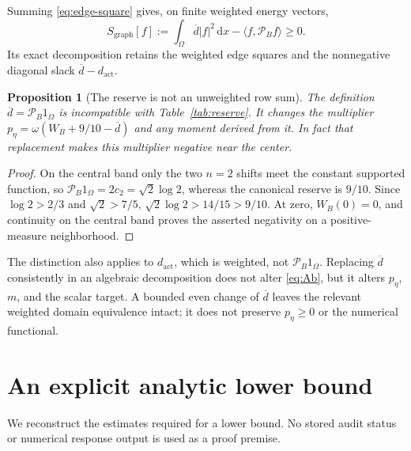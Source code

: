 \documentclass[11pt,a4paper]{article}
\newcommand{\ip}[2]{\langle #1,#2\rangle}
\newcommand{\dd}{\,\mathrm dx}
\newcommand{\peta}{p_{\eta}}
\newcommand{\dbar}{\overline d}
\newcommand{\Pp}{\mathcal P_B}
\newtheorem{proposition}[theorem]{Proposition}
\theoremstyle{remark}
\numberwithin{equation}{section}
\begin{document}
Summing \eqref{eq:edge-square} gives, on finite weighted energy vectors,
\begin{equation}\label{eq:Sgraph}
 S_{\mathrm{graph}}[f]
 :=\int_\Omega\dbar|f|^2\dd-\ip{f}{\Pp f}\ge0.
\end{equation}
Its exact decomposition retains the weighted edge squares and the
nonnegative diagonal slack $\dbar-d_{\mathrm{act}}$.

\begin{proposition}[The reserve is not an unweighted row sum]\label{prop:correction}
The definition $\dbar=\Pp1_\Omega$ is incompatible with
Table~\ref{tab:reserve}. It changes the multiplier
$\peta=\omega(W_B+9/10-\dbar)$ and any moment derived from it.
In fact that replacement makes this multiplier negative near the center.
\end{proposition}
\begin{proof}
On the central band only the two $n=2$ shifts meet the constant supported
function, so $\Pp1_\Omega=2c_2=\sqrt2\log2$, whereas the canonical
reserve is $9/10$. Since $\log2>2/3$ and $\sqrt2>7/5$,
$\sqrt2\log2>14/15>9/10$. At zero, $W_B(0)=0$, and continuity on the
central band proves the asserted negativity on a positive-measure
neighborhood.
\end{proof}
The distinction also applies to $d_{\mathrm{act}}$, which is weighted,
not $\Pp1_\Omega$. Replacing $\dbar$ consistently in an algebraic
decomposition does not alter \eqref{eq:Ab}, but it alters $\peta$, $m$, and
the scalar target. A bounded even change of $\dbar$ leaves the relevant
weighted domain equivalence intact; it does not preserve $\peta\ge0$ or
the numerical functional.

\section{An explicit analytic lower bound}\label{sec:lower}
We reconstruct the estimates required for a lower bound. No stored audit
status or numerical response output is used as a proof premise.
\end{document}

